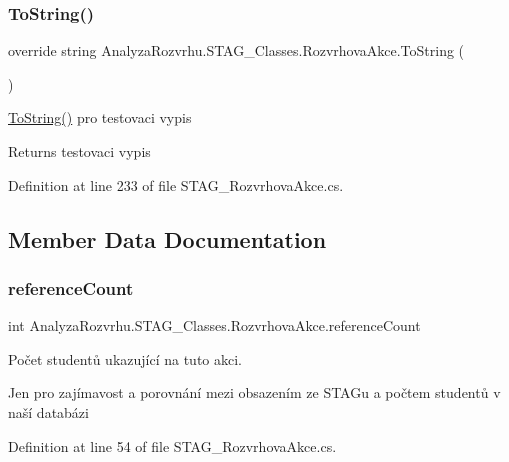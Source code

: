 \subsubsection{\texorpdfstring{To\+String()}{ToString()}}
{\footnotesize\ttfamily override string Analyza\+Rozvrhu.\+S\+T\+A\+G\+\_\+\+Classes.\+Rozvrhova\+Akce.\+To\+String (\begin{DoxyParamCaption}{ }\end{DoxyParamCaption})}



\hyperlink{class_analyza_rozvrhu_1_1_s_t_a_g___classes_1_1_rozvrhova_akce_aa44761eaf04af4bc620ae106fb992488}{To\+String()} pro testovaci vypis 

\begin{DoxyReturn}{Returns}
testovaci vypis
\end{DoxyReturn}


Definition at line 233 of file S\+T\+A\+G\+\_\+\+Rozvrhova\+Akce.\+cs.



\subsection{Member Data Documentation}
\mbox{\label{class_analyza_rozvrhu_1_1_s_t_a_g___classes_1_1_rozvrhova_akce_acb9f8cef4acf7425c028b4da05f4717b}} 
\subsubsection{\texorpdfstring{reference\+Count}{referenceCount}}
{\footnotesize\ttfamily int Analyza\+Rozvrhu.\+S\+T\+A\+G\+\_\+\+Classes.\+Rozvrhova\+Akce.\+reference\+Count}



Počet studentů ukazující na tuto akci. 

Jen pro zajímavost a porovnání mezi obsazením ze S\+T\+A\+Gu a počtem studentů v naší databázi

Definition at line 54 of file S\+T\+A\+G\+\_\+\+Rozvrhova\+Akce.\+cs.




